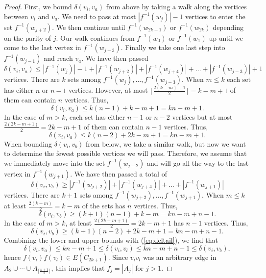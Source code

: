 \documentclass[11pt,a4paper]{article}
\begin{document}
\begin{proof}
First, we bound $\delta(v_i,v_a)$ from above by taking a walk along the vertices between $v_i$ and $v_a$. We need to pass at most $|f^{-1}(w_j)|-1$ vertices to enter the set $f^{-1}(w_{j+2})$. We then continue until $f^{-1}(w_{2k-1})$ or $f^{-1}(w_{2k})$ depending on the parity of $j$. Our walk continues from $f^{-1}(w_{0})$ or $f^{-1}(w_1)$ up until we come to the last vertex in $f^{-1}(w_{j-3})$. Finally we take one last step into $f^{-1}(w_{j-1})$ and reach $v_a$. We have then passed
\[
\delta(v_i,v_a) \leq |f^{-1}(w_j)|-1+|f^{-1}(w_{j+2})|+|f^{-1}(w_{j+4})|+\ldots+|f^{-1}(w_{j-3})|+1
\]
vertices. There are $k$ sets among $f^{-1}(w_{j}),\ldots,f^{-1}(w_{j-3})$. When $m \leq k$ each set has either $n$ or $n-1$ vertices. However, at most $\lceil\frac{2(k-m)+1}{2}\rceil =k-m+1$ of them can contain $n$ vertices. Thus,
\[
\delta(v_i,v_a) \leq k(n-1)+ k-m+1 = kn-m+1.
\]
In the case of $m > k$, each set has either $n-1$ or $n-2$ vertices but at most $\frac{2(2k-m+1)}{2}=2k-m+1$ of them can contain $n-1$ vertices. Thus,
\[
\delta(v_i,v_a) \leq k(n-2) + 2k-m+1 = kn-m+1.
\]
When bounding $\delta(v_i,v_b)$ from below, we take a similar walk, but now we want to determine the fewest possible vertices we will pass. Therefore, we assume that we immediately move into the set $f^{-1}(w_{j+2})$ and will go all the way to the last vertex in $f^{-1}(w_{j+1})$. We have then passed a total of
\[
\delta(v_i,v_b) \geq |f^{-1}(w_{j+2})|+|f^{-1}(w_{j+4})|+\ldots+|f^{-1}(w_{j+1})|
\]
vertices. There are $k+1$ sets among $f^{-1}(w_{j+2}),\ldots,f^{-1}(w_{j+1})$.  When $m \leq k$ at least $\frac{2(k-m)}{2}=k-m$ of the sets has $n$ vertices. Thus,
\[
\delta(v_i,v_b) \geq (k+1)(n-1)+k-m = kn-m+n-1.
\]
In the case of $m > k$, at least $\frac{2(2k-m+1)}{2} = 2k-m+1$ has $n-1$ vertices. Thus,
\[
\delta(v_i,v_b)\geq (k+1)(n-2) + 2k-m+1 = kn-m+n-1.
\]
Combining the lower and upper bounds with (\ref{eq:deltail}), we find that
\[
\delta(v_i,v_a) \leq kn-m+1 \leq \delta(v_i,v_l) \leq kn-m+n-1 \leq \delta(v_i,v_b),
\]
hence $f(v_i) f(v_l) \in E(C_{2k+1})$.
Since $v_i v_l$ was an arbitrary edge in $A_2 \cup \cdots \cup A_{\lceil \frac{n+1}{2} \rceil}$, this implies that $f_j = |A_j|$ for $j > 1$.


\end{proof}
\end{document}
